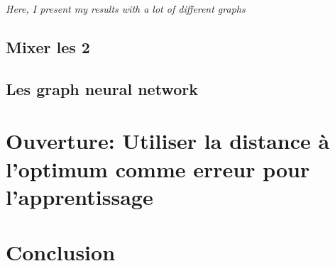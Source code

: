 \documentclass[letterpaper]{article}
\begin{document}
\begin{multicols}{2}
\textit{Here, I present my results with a lot of different graphs}

\subsection{Mixer les 2}

\subsection{Les graph neural network}

\section{Ouverture: Utiliser la distance à l'optimum comme erreur pour l'apprentissage}

\section{Conclusion}

\end{multicols}
\end{document}
